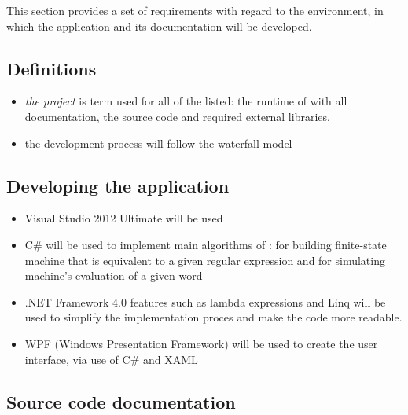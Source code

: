 \documentclass{article}
\begin{document}
This section provides a set of requirements with regard to the environment, in which the application
and its documentation will be developed.

\subsection*{Definitions}

\begin{itemize}

  \item \textit{the project} is term used for all of the listed: the runtime of \titletext{} with
  all documentation, the source code and required external libraries.

  \item the development process will follow the waterfall model

\end{itemize}

\subsection{Developing the application}

\begin{itemize}

  \item Visual Studio 2012 Ultimate will be used

  \item C\# will be used to implement main algorithms of \titletext: for building finite-state
  machine that is equivalent to a given regular expression and for simulating machine's evaluation
  of a given word

  \item .NET Framework 4.0 features such as lambda expressions and Linq will be used to simplify the
  implementation proces and make the code more readable.

  \item WPF (Windows Presentation Framework) will be used to create the user interface, via use of
  C\# and XAML

\end{itemize}

\subsection{Source code documentation}
\end{document}
